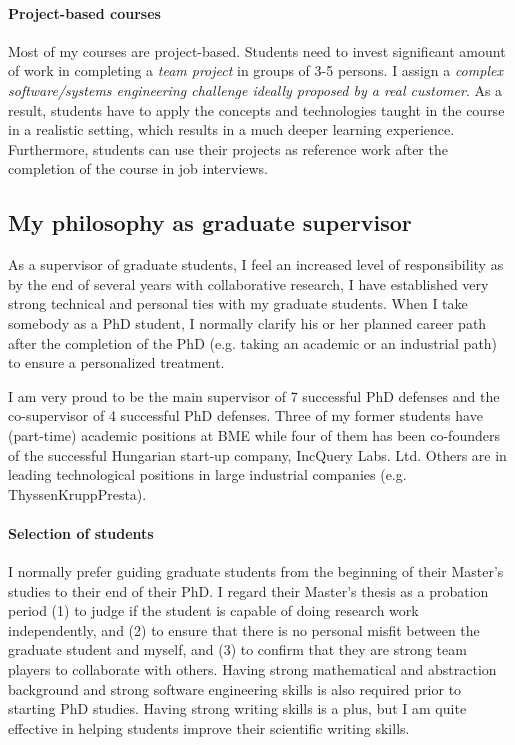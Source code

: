 \documentclass[a4paper,11pt]{report}
\begin{document}
\paragraph{Project-based courses}
Most of my courses are project-based. Students need to invest significant amount of work in completing a \emph{team 
project} in groups of 3-5 persons. I assign a \emph{complex software/systems engineering challenge ideally proposed by a 
real customer}. As a result, students have to apply the concepts and technologies taught in the course in a realistic setting, 
which results in a much deeper learning experience. Furthermore, students can use their projects as reference work after 
the completion of the course in job interviews. 


\subsection{My philosophy as graduate supervisor}

As a supervisor of graduate students, I feel an increased level of responsibility as by the end of several years with collaborative research, I have established very strong technical and personal ties with my graduate students. When I take somebody as a PhD student, I normally clarify his or her planned career path after the completion of the PhD (e.g. taking an academic or an industrial path) to ensure a personalized treatment. 

I am very proud to be the main supervisor of 7 successful PhD defenses and the co-supervisor of 4 successful PhD defenses. Three of my former students have (part-time) academic positions at BME while four of them has been co-founders of the successful Hungarian start-up company, IncQuery Labs. Ltd. Others are in leading technological positions in large industrial companies (e.g. ThyssenKruppPresta).

\paragraph{Selection of students}
I normally prefer guiding graduate students from the beginning of their Master's studies to their end of their PhD. I regard their Master's thesis as a probation period (1) to judge if the student is capable of doing research work independently, and (2) to ensure that there is no personal misfit between the graduate student and myself, and (3) to confirm that they are strong team players to collaborate with others. Having strong mathematical and abstraction background and strong software engineering skills is also required prior to starting PhD studies. Having strong writing skills is a plus, but I am quite effective in helping students improve their scientific writing skills. 
\end{document}
